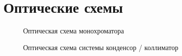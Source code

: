\documentclass[a4paper]{article}
\begin{document}
		\newpage
		
	\section*{Оптические схемы}
	
	\begin{figure}[h]
		
		\vskip -0.5cm
		
		\caption{Оптическая схема монохроматора}
		
		\raisebox{-.5\height}{%
			\texttt{[image: 1]}%
		}
	
		\vskip 0.5cm
	
		\caption{Оптическая схема системы конденсор / коллиматор}

		\raisebox{-.5\height}{%
			\texttt{[image: 2]}%
		}
		
	\end{figure}
	
\end{document}

